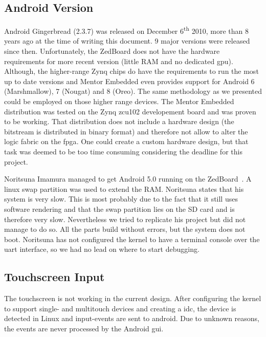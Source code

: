 \subsection{Android Version}
Android Gingerbread (2.3.7) was released on December 6\textsuperscript{th} 2010,
more than 8 years ago at the time of writing this document.
9 major versions were released since then.
Unfortunately, the ZedBoard does not have the hardware requirements for more
recent version (little RAM and no dedicated \gls{gpu}).
Although, the higher-range Zynq chips do have the requirements to run the most
up to date versions and Mentor Embedded even provides support for Android 6
(Marshmallow), 7 (Nougat) and 8 (Oreo).
The same methodology as we presented could be employed on those higher range
devices.
The Mentor Embedded distribution was tested on the Zynq zcu102 developement
board and was proven to be working.
That distribution does not include a hardware design (the bitstream is
distributed in binary format) and therefore not allow to alter the logic fabric
on the \gls{fpga}.
One could create a custom hardware design, but that task was deemed to be too
time consuming considering the deadline for this project.

Noritsuna Imamura managed to get Android 5.0 running on the
ZedBoard~\cite{noritsuna}.
A linux swap partition was used to extend the RAM.
Noritsuna states that his system is very slow.
This is most probably due to the fact that it still uses software rendering and
that the swap partition lies on the SD card and is therefore very slow.
Nevertheless we tried to replicate his project but did not manage to do so.
All the parts build without errors, but the system does not boot.
Noritsuna has not configured the kernel to have a terminal console over the
\gls{uart} interface, so we had no lead on where to start debugging.

\subsection{Touchscreen Input}
The touchscreen is not working in the current design.
After configuring the kernel to support single- and multitouch devices and
creating a \gls{idc}, the device is detected in Linux and input-events are sent
to android.
Due to unknown reasons, the events are never processed by the Android \gls{gui}.

